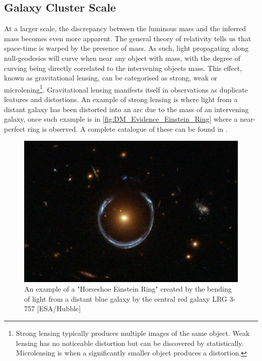 \subsection{Galaxy Cluster Scale}
\par
At a larger scale, the discrepancy between the luminous mass and the inferred mass becomes even more apparent.
The general theory of relativity tells us that space-time is warped by the presence of mass.
As such, light propagating along null-geodesics will curve when near any object with mass, with the degree of curving being directly correlated to the intervening objects mass.
This effect, known as gravitational lensing, can be categorised as strong, weak or microlening\footnote{Strong lensing typically produces multiple images of the same object. Weak lensing has no noticeable distortion but can be discovered by statistically. Microlensing is when a significantly smaller object produces a distortion.}. 
Gravitational lensing manifests itself in observations as duplicate features and distortions.
An example of strong lensing is where light from a distant galaxy has been distorted into an arc due to the mass of an intervening galaxy, once such example is in \autoref{fig:DM_Evidence_Einstein_Ring}  where a near-perfect ring is observed.
A complete catalogue of these can be found in \cite{einstein_ring_discovery_ref}.

\begin{figure}[!htbp]%
    \centering
    \includegraphics[scale=0.4]{Figures/DarkMatterEvidence/Einstein_Ring_from_Hubble.JPG}
    \caption{An example of a "Horseshoe Einstein Ring" created by the bending of light from a distant blue galaxy by the central red galaxy LRG 3-757 [ESA/Hubble]}
    \label{fig:DM_Evidence_Einstein_Ring}
\end{figure}

